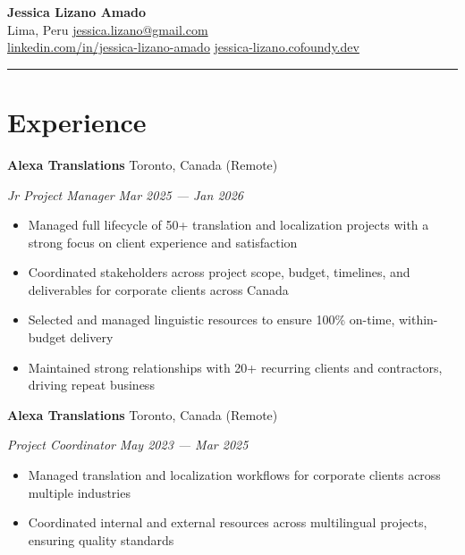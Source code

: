 \documentclass[11pt,letterpaper]{article}
\newcommand{\entry}[4]{%
  \noindent\textbf{#1} \hfill #2 \par\nopagebreak
  \textit{#3} \hfill \textit{#4} \par\nopagebreak
}
\begin{document}
\begin{center}
  {\LARGE\bfseries Jessica Lizano Amado} \\[4pt]
  \enspace Lima, Peru
  \quad{}\enspace \href{mailto:jessica.lizano@gmail.com}{jessica.lizano@gmail.com}
  \\[2pt]
  \enspace \href{https://www.linkedin.com/in/jessica-lizano-amado/}{linkedin.com/in/jessica-lizano-amado}
  \quad{}\enspace \href{https://jessica-lizano.cofoundy.dev}{jessica-lizano.cofoundy.dev}
\end{center}

\vspace{-0.4em}
\noindent\rule{\textwidth}{0.8pt}
\vspace{-0.8em}

\section{Experience}

\entry{Alexa Translations}{Toronto, Canada (Remote)}{Jr Project Manager}{Mar 2025 --- Jan 2026}
\begin{itemize}
  \item Managed full lifecycle of 50+ translation and localization projects with a strong focus on client experience and satisfaction
  \item Coordinated stakeholders across project scope, budget, timelines, and deliverables for corporate clients across Canada
  \item Selected and managed linguistic resources to ensure 100\% on-time, within-budget delivery
  \item Maintained strong relationships with 20+ recurring clients and contractors, driving repeat business
\end{itemize}
\vspace{0.3em}

\entry{Alexa Translations}{Toronto, Canada (Remote)}{Project Coordinator}{May 2023 --- Mar 2025}
\begin{itemize}
  \item Managed translation and localization workflows for corporate clients across multiple industries
  \item Coordinated internal and external resources across multilingual projects, ensuring quality standards
\end{itemize}
\vspace{0.3em}
\end{document}
